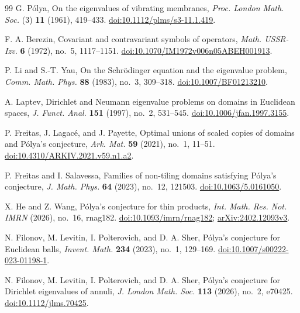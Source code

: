 \documentclass[11pt,reqno]{amsart}
\numberwithin{equation}{section}
\begin{document}
\begin{thebibliography}{99}
G. P\'olya,
On the eigenvalues of vibrating membranes,
\emph{Proc. London Math. Soc.} (3) \textbf{11} (1961), 419--433.
\href{https://doi.org/10.1112/plms/s3-11.1.419}{doi:10.1112/plms/s3-11.1.419}.

F. A. Berezin,
Covariant and contravariant symbols of operators,
\emph{Math. USSR-Izv.} \textbf{6} (1972), no.~5, 1117--1151.
\href{https://doi.org/10.1070/IM1972v006n05ABEH001913}{doi:10.1070/IM1972v006n05ABEH001913}.

P. Li and S.-T. Yau,
On the Schr\"odinger equation and the eigenvalue problem,
\emph{Comm. Math. Phys.} \textbf{88} (1983), no.~3, 309--318.
\href{https://doi.org/10.1007/BF01213210}{doi:10.1007/BF01213210}.

A. Laptev,
Dirichlet and Neumann eigenvalue problems on domains in Euclidean spaces,
\emph{J. Funct. Anal.} \textbf{151} (1997), no.~2, 531--545.
\href{https://doi.org/10.1006/jfan.1997.3155}{doi:10.1006/jfan.1997.3155}.

P. Freitas, J. Lagac\'e, and J. Payette,
Optimal unions of scaled copies of domains and P\'olya's conjecture,
\emph{Ark. Mat.} \textbf{59} (2021), no.~1, 11--51.
\href{https://doi.org/10.4310/ARKIV.2021.v59.n1.a2}{doi:10.4310/ARKIV.2021.v59.n1.a2}.

P. Freitas and I. Salavessa,
Families of non-tiling domains satisfying P\'olya's conjecture,
\emph{J. Math. Phys.} \textbf{64} (2023), no.~12, 121503.
\href{https://doi.org/10.1063/5.0161050}{doi:10.1063/5.0161050}.

X. He and Z. Wang,
P\'olya's conjecture for thin products,
\emph{Int. Math. Res. Not. IMRN} (2026), no.~16, rnag182.
\href{https://doi.org/10.1093/imrn/rnag182}{doi:10.1093/imrn/rnag182};
\href{https://arxiv.org/abs/2402.12093v3}{arXiv:2402.12093v3}.

N. Filonov, M. Levitin, I. Polterovich, and D. A. Sher,
P\'olya's conjecture for Euclidean balls,
\emph{Invent. Math.} \textbf{234} (2023), no.~1, 129--169.
\href{https://doi.org/10.1007/s00222-023-01198-1}{doi:10.1007/s00222-023-01198-1}.

N. Filonov, M. Levitin, I. Polterovich, and D. A. Sher,
P\'olya's conjecture for Dirichlet eigenvalues of annuli,
\emph{J. London Math. Soc.} \textbf{113} (2026), no.~2, e70425.
\href{https://doi.org/10.1112/jlms.70425}{doi:10.1112/jlms.70425}.


\end{thebibliography}
\end{document}
